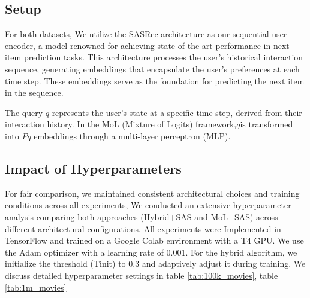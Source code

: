 \subsection{ Setup }For both datasets, We utilize the SASRec architecture as our sequential user encoder, a model renowned for achieving state-of-the-art performance in next-item prediction tasks. This architecture processes the user's historical interaction sequence, generating embeddings that encapsulate the user's preferences at each time step. These embeddings serve as the foundation for predicting the next item in the sequence.

The query \( q \) represents the user's state at a specific time step, derived from their interaction history. In the MoL (Mixture of Logits) framework,\( q \)is transformed into \( Pq \)
embeddings through a multi-layer perceptron (MLP).
\subsection{Impact of Hyperparameters}
For fair comparison, we maintained consistent architectural choices and training conditions across all experiments, We conducted an extensive hyperparameter analysis comparing both approaches (Hybrid+SAS and MoL+SAS) across different architectural configurations. All experiments were Implemented in TensorFlow and trained on a Google Colab environment with a T4 GPU. We use the Adam optimizer with a learning rate of 0.001. For the hybrid algorithm, we initialize the threshold (Tinit) to 0.3 and adaptively adjust it during training. We discuss detailed hyperparameter settings in table \ref{tab:100k_movies}, table \ref{tab:1m_movies}


\newpage


\setlength{\tabcolsep}{1pt} %

